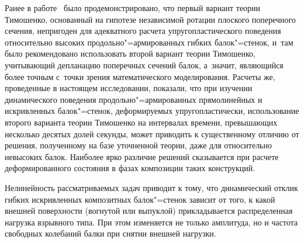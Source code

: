 \smallskip

 Ранее в работе~\cite{yank:bib13} было продемонстрировано, что первый
вариант теории Тимошенко, основанный на гипотезе независимой ротации
плоского поперечного сечения, непригоден для адекватного расчета
упругопластического поведения относительно высоких продольно"=армированных
гибких балок"=стенок, и~там было рекомендовано использовать второй вариант
теории Тимошенко, учитывающий депланацию поперечных сечений балок, а~значит,
являющийся более точным с~точки зрения математического моделирования.
Расчеты же, проведенные в настоящем исследовании, показали, что при изучении
динамического поведения продольно"=армированных прямолинейных и искривленных
балок"=стенок, деформируемых упругопластически, использование второго
варианта теории Тимошенко на интервалах времени, превышающих несколько
десятых долей секунды, может приводить к существенному отличию от решения,
полученному на базе уточненной теории, даже для относительно невысоких
балок. Наиболее ярко различие решений сказывается при расчете
деформированного состояния в фазах композиции таких конструкций.

Нелинейность рассматриваемых задач приводит к тому, что динамический отклик
гибких искривленных композитных балок"=стенок зависит от того, к какой
внешней поверхности (вогнутой или выпуклой) прикладывается распределенная
нагрузка взрывного типа. При этом изменяется не только амплитуда, но и
частота свободных колебаний балки при снятии внешней нагрузки.




